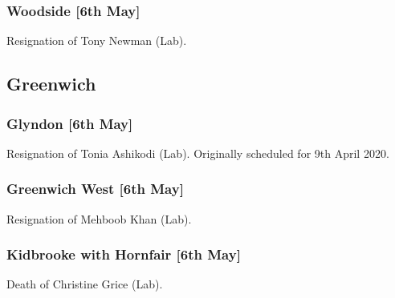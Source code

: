 \documentclass[a4paper,openany]{book}
\begin{document}
\begin{resultsiii}
\subsubsection*{Woodside \hspace*{\fill}\nolinebreak[1]%
	\enspace\hspace*{\fill}
	[6th May]}


Resignation of Tony Newman (Lab).

\subsection*{Greenwich}

\subsubsection*{Glyndon \hspace*{\fill}\nolinebreak[1]%
	\enspace\hspace*{\fill}
	[6th May]}


Resignation of Tonia Ashikodi (Lab).  Originally scheduled for 9th April 2020.

\subsubsection*{Greenwich West \hspace*{\fill}\nolinebreak[1]%
	\enspace\hspace*{\fill}
	[6th May]}


Resignation of Mehboob Khan (Lab).

\subsubsection*{Kidbrooke with Hornfair \hspace*{\fill}\nolinebreak[1]%
	\enspace\hspace*{\fill}
	[6th May]}


Death of Christine Grice (Lab).


\end{resultsiii}
\end{document}
